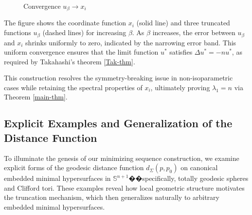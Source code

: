 \documentclass[a4, 12pt]{amsart}
\numberwithin{equation}{section} \numberwithin{equation}{section}
\begin{document}
\begin{figure}[h!]
    \centering
    \caption{Convergence $ u_\beta \to x_i $}
    \label{fig:ubeta-convergence}
\end{figure}

The figure shows the coordinate function $ x_i $ (solid line) and three truncated functions $ u_\beta $ (dashed lines) for increasing $ \beta $. As $ \beta $ increases, the error between $ u_\beta $ and $ x_i $ shrinks uniformly to zero, indicated by the narrowing error band. This uniform convergence ensures that the limit function $ u^* $ satisfies $ \Delta u^* = -n u^* $, as required by Takahashi's theorem \ref{Tak-thm}.

This construction resolves the symmetry-breaking issue in non-isoparametric cases while retaining the spectral properties of $ x_i $, ultimately proving $ \lambda_1 = n $ via Theorem \ref{main-thm}.







\subsection{Explicit Examples and Generalization of the Distance Function}

To illuminate the genesis of our minimizing sequence construction, we examine explicit forms of the geodesic distance function $d_\Sigma(p, p_0)$ on canonical embedded minimal hypersurfaces in $\mathbb{S}^{n+1}$��specifically, totally geodesic spheres and Clifford tori. These examples reveal how local geometric structure motivates the truncation mechanism, which then generalizes naturally to arbitrary embedded minimal hypersurfaces.
\end{document}
